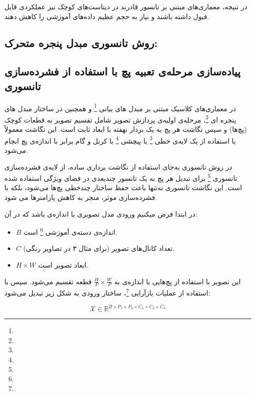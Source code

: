 در نتیجه، معماری‌های مبتنی بر تانسور قادرند در دیتاست‌های کوچک نیز عملکردی قابل قبول داشته باشند و نیاز به حجم عظیم داده‌های آموزشی را کاهش دهند.



\subsection{روش تانسوری مبدل پنجره متحرک:}




\subsection{پیاده‌سازی مرحله‌ی  تعبیه پچ
	با استفاده از فشرده‌سازی تانسوری}

در معماری‌های کلاسیک مبتنی بر مبدل های بیانی \footnote{}  و همچنین در ساختار مبدل های پنجره ای \footnote{}، مرحله‌ی اولیه‌ی پردازش تصویر شامل تقسیم تصویر به قطعات کوچک (پچ‌ها) و سپس نگاشت هر پچ به یک بردار نهفته با ابعاد ثابت است. این نگاشت معمولاً با استفاده از یک لایه‌ی خطی \footnote{} یا پیچشی \footnote{} با کرنل و گام برابر با اندازه‌ی پچ انجام می‌شود.

در روش تانسوری به‌جای استفاده از نگاشت برداری ساده، از لایه‌ی فشرده‌سازی تانسوری \footnote{} برای تبدیل هر پچ به یک تانسور چندبعدی در فضای ویژگی استفاده شده است. این نگاشت تانسوری نه‌تنها باعث حفظ ساختار چندخطی پچ‌ها می‌شود، بلکه با فشرده‌سازی موثر، منجر به کاهش پارامترها می شود.




در ابتدا فرض میکنیم  ورودی مدل تصویری با اندازه‌ی  باشد که در آن:

\begin{itemize}
	\item $B$ اندازه‌ی دسته‌ی آموزشی \footnote{} است.
	\item $C$ تعداد کانال‌های تصویر (برای مثال ۳ در تصاویر رنگی).
	\item $H \times W$ ابعاد تصویر است.
\end{itemize}

این تصویر با استفاده از پچ‌هایی با اندازه‌ی  به $\frac{H}{P} \times \frac{W}{P}$ قطعه تقسیم می‌شود. سپس با استفاده از عملیات بازآرایی \footnote{}، ساختار ورودی به شکل زیر تبدیل می‌شود:

\[
\mathcal{X} \in \mathbb{R}^{B \times P_1 \times P_2 \times C_1 \times C_2 \times C_3}
\]

